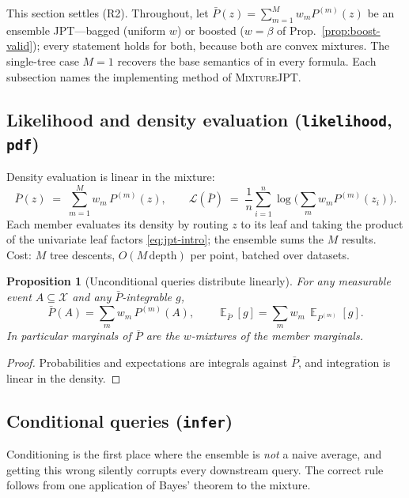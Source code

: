 \documentclass[11pt]{article}
\theoremstyle{plain}
\newtheorem{proposition}[theorem]{Proposition}
\theoremstyle{definition}
\theoremstyle{remark}
\DeclareMathOperator{\E}{\mathbb{E}}
\newcommand{\Xsp}{\mathcal{X}}
\newcommand{\mixture}{\textsc{MixtureJPT}}
\begin{document}
This section settles (R2). Throughout, let
$\bar P(z)=\sum_{m=1}^M w_m P^{(m)}(z)$ be an ensemble JPT---bagged
(uniform $w$) or boosted ($w=\beta$ of Prop.~\ref{prop:boost-valid});
every statement holds for both, because both are convex mixtures. The
single-tree case $M=1$ recovers the base semantics of
\citet{nyga2023jpt} in every formula. Each subsection names the
implementing method of \mixture{}.

\subsection{Likelihood and density evaluation
(\texttt{likelihood}, \texttt{pdf})}

Density evaluation is linear in the mixture:
\begin{equation}
\label{eq:mix-lik}
\bar P(z)\;=\;\sum_{m=1}^M w_m\, P^{(m)}(z),
\qquad
\mathcal{L}(\bar P)\;=\;\frac1n\sum_{i=1}^n
\log\Big(\sum_m w_m P^{(m)}(z_i)\Big).
\end{equation}
Each member evaluates its density by routing $z$ to its leaf and taking
the product of the univariate leaf factors \eqref{eq:jpt-intro}; the
ensemble sums the $M$ results. Cost: $M$ tree descents,
$O(M\,\text{depth})$ per point, batched over datasets.

\begin{proposition}[Unconditional queries distribute linearly]
\label{prop:uncond}
For any measurable event $A\subseteq\Xsp$ and any $\bar P$-integrable
$g$,
\[
\bar P(A)=\sum_m w_m\,P^{(m)}(A),
\qquad
\E_{\bar P}[g]=\sum_m w_m\,\E_{P^{(m)}}[g].
\]
In particular marginals of $\bar P$ are the $w$-mixtures of the member
marginals.
\end{proposition}
\begin{proof}
Probabilities and expectations are integrals against $\bar P$, and
integration is linear in the density.
\end{proof}

\subsection{Conditional queries (\texttt{infer})}
\label{sec:infer}

Conditioning is the first place where the ensemble is \emph{not} a naive
average, and getting this wrong silently corrupts every downstream
query. The correct rule follows from one application of Bayes' theorem to
the mixture.
\end{document}
